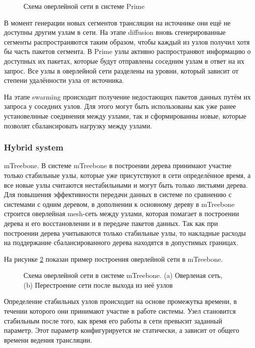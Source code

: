 		\begin{figure}[H]
			\caption{Схема оверлейной сети в системе Prime}
			\label{img:prime-overlay}
		\end{figure}

		В момент генерации новых сегментов трансляции на источнике они ещё не доступны другим узлам в сети. На этапе
		diffusion вновь сгенерированные сегменты распространяются таким образом, чтобы каждый из узлов получил хотя бы
		часть пакетов сегмента. В Prime узлы активно распространяют информацию о доступных их пакетах, которые будут
		отправлены соседним узлам в ответ на их запрос. Все узлы в оверлейной сети разделены на уровни, который зависит
		от степени удалённости узла от источника.

		На этапе swarming происходит получение недостающих пакетов данных путём их запроса у соседних узлов. Для этого
		могут быть использованы как уже ранее установелнные соединения между узлами, так и сформированны новые, которые
		позволят сбалансировать нагрузку между узлами.

		\subsubsection{Hybrid system}

		mTreebone. В системе mTreebone \cite{4268203} в построении дерева принимают участие только стабильные узлы, которые уже присутствуют в
		сети определённое время, а все новые узлы считаются нестабильными и могут быть только листьями дерева. Для
		повышения эффективности передачи данных в системе по сравнению с системами с одним деревом, в дополнении к
		основному дереву в mTreebone строится оверлейная mesh-сеть между узлами, которая помагает в построении дерева и
		его восстановлении и в передаче пакетов данных. Так как при построении дерева учитываются только стабильные узлы,
		то накладные расходы на поддержание сбалансированного дерева находятся в допустимых границах.

		На рисунке \ref{img:mtreebone-overlay} показан пример построения оверлейной сети в mTreebone.
		\begin{figure}[h]
			\caption{Схема оверлейной сети в системе mTreebone. (a) Оверленая сеть, (b) Перестроение сети после
			выхода из неё узлов}
			\label{img:mtreebone-overlay}
		\end{figure}

		Определение стабильных узлов происходит на основе промежутка времени, в течении которого они принимают участие в
		работе системы. Узел становится стабильным после того, как время его работы в сети превысит заданный параметр.
		Этот параметр конфигурируется не статически, а зависит от общего времени ведения трансляции.

